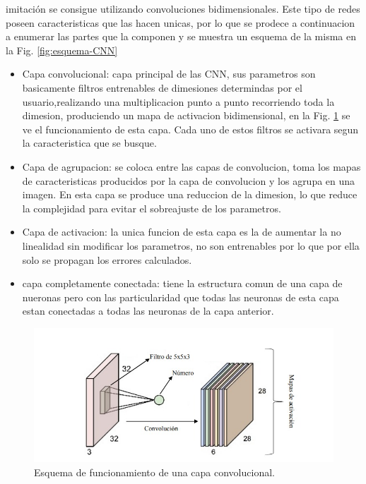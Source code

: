 imitación se consigue utilizando convoluciones bidimensionales. Este tipo de redes poseen caracteristicas que las hacen unicas, por lo que
se prodece a continuacion a enumerar las partes que la componen y se muestra un esquema de la misma en la Fig. \ref*{fig:esquema-CNN}
\begin{itemize}
    \item Capa convolucional: capa principal de las CNN, sus parametros son basicamente filtros entrenables de dimesiones determindas por el
          usuario,realizando una multiplicacion punto a punto recorriendo toda la dimesion, produciendo un mapa de activacion bidimensional, en la
          Fig. \ref{fig:esquema-capa-convolucional} se ve el funcionamiento de esta capa. Cada uno de estos filtros se activara segun la
          caracteristica que se busque.
    \item Capa de agrupacion: se coloca entre las capas de convolucion, toma los mapas de caracteristicas producidos por la capa de
          convolucion y los agrupa en una imagen. En esta capa se produce una reduccion de la dimesion, lo que reduce la complejidad
          para evitar el sobreajuste de los parametros.
    \item Capa de activacion: la unica funcion de esta capa es la de aumentar la no linealidad sin modificar los parametros, no son entrenables
          por lo que por ella solo se propagan los errores calculados.
    \item capa completamente conectada: tiene la estructura comun de una capa de nueronas pero con las particularidad que todas las neuronas
          de esta capa estan conectadas a todas las neuronas de la capa anterior.
\end{itemize}
\begin{figure}
    \centering
    \includegraphics[width=1\textwidth]{imgs/capa-convolucional.jpeg}
    \caption{Esquema de funcionamiento de una capa convolucional.}
    \label{fig:esquema-capa-convolucional}
\end{figure}

